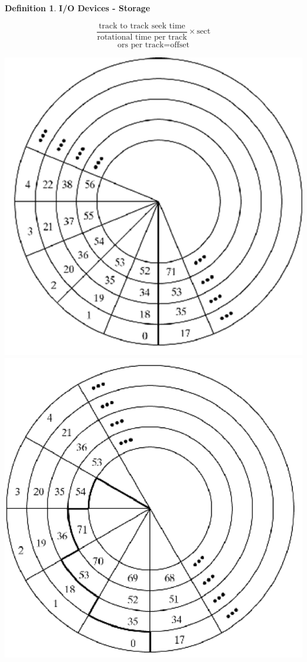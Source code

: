 \documentclass[11pt,a4paper]{article}
\theoremstyle{definition}
\newtheorem{definition}{Definition}[section]
\begin{document}
\begin{definition}{\textbf{I/O Devices - Storage}}
\begin{minipage}{0.3\linewidth}
		\[\frac{\text{track to track seek time}}{\text{rotational time per track}} \times \text{sect} \]
		\[\text{ors per track} = \text{offset}\]
	\end{minipage}
	\begin{minipage}{0.7\linewidth}
		\includegraphics[width=0.5\linewidth]{m3/diskTrackView3}
		\includegraphics[width=0.5\linewidth]{m3/diskTrackView4}
	\end{minipage}
	

\end{definition}
\end{document}
